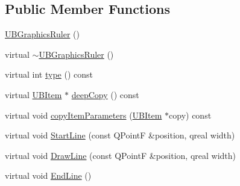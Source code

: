 \subsection*{Public Member Functions}
\begin{DoxyCompactItemize}
\item 
\hyperlink{class_u_b_graphics_ruler_a36363baee439d09417565d2db44eb6bd}{U\-B\-Graphics\-Ruler} ()
\item 
virtual \hyperlink{class_u_b_graphics_ruler_a07f25e3bd456a8d3250f1a21c7bbbc29}{$\sim$\-U\-B\-Graphics\-Ruler} ()
\item 
virtual int \hyperlink{class_u_b_graphics_ruler_a898d70a2da485dd2d082d9793df78b48}{type} () const 
\item 
virtual \hyperlink{class_u_b_item}{U\-B\-Item} $\ast$ \hyperlink{class_u_b_graphics_ruler_a3f12aaa2bb10de151191bfa57097aeb4}{deep\-Copy} () const 
\item 
virtual void \hyperlink{class_u_b_graphics_ruler_adb8e2e0d97de3099a4c66d21674cab02}{copy\-Item\-Parameters} (\hyperlink{class_u_b_item}{U\-B\-Item} $\ast$copy) const 
\item 
virtual void \hyperlink{class_u_b_graphics_ruler_a8be968219769cc2fa025bbdf50c044d6}{Start\-Line} (const Q\-Point\-F \&position, qreal width)
\item 
virtual void \hyperlink{class_u_b_graphics_ruler_abd518dbf4a5fc6b4351ab0441920f27f}{Draw\-Line} (const Q\-Point\-F \&position, qreal width)
\item 
virtual void \hyperlink{class_u_b_graphics_ruler_ae42d5fdd24a3e7d98a80b8d2f973b35e}{End\-Line} ()
\end{DoxyCompactItemize}
